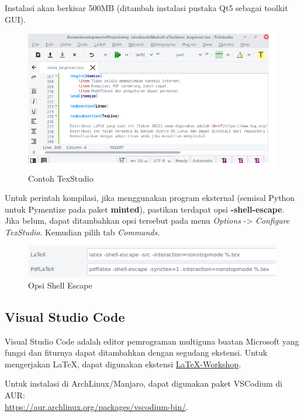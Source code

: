 \documentclass{book} %
\begin{document}
	Instalasi akan berkisar 500MB (ditambah instalasi pustaka Qt5 sebagai toolkit GUI).

	\newpage
	\begin{figure}[!ht]
		\centering
		\includegraphics[width=400pt]{images/texstudio}
		\caption{Contoh TexStudio}
	\end{figure}

	Untuk perintah kompilasi, jika menggunakan program eksternal (semisal Python untuk Pymentize pada paket \textbf{minted}),
	pastikan terdapat opsi \textbf{-shell-escape}.
	Jika belum, dapat ditambahkan opsi tersebut pada menu \textit{Options} -> \textit{Configure TexStudio}.
	Kemudian pilih tab \textit{Commands}.

	\begin{figure}[!ht]
		\centering
		\includegraphics[width=400pt]{images/texstudio_shellescape}
		\caption{Opsi Shell Escape}
	\end{figure}

	\subsection{Visual Studio Code}

	Visual Studio Code adalah editor pemrograman multiguna buatan Microsoft yang fungsi dan fiturnya dapat ditambahkan dengan segudang ekstensi.
	Untuk mengerjakan \LaTeX{}, dapat digunakan ekstensi \href{https://github.com/James-Yu/LaTeX-Workshop}{LaTeX-Workshop}.

	Untuk instalasi di ArchLinux/Manjaro, dapat digunakan paket VSCodium di AUR:\\
	\url{https://aur.archlinux.org/packages/vscodium-bin/}.
\end{document}
